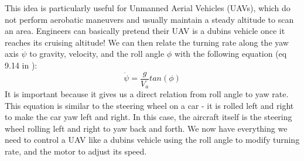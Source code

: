 \documentclass[12pt,journal,compsoc]{IEEEtran}
\begin{document}
This idea is particularly useful for Unmanned Aerial Vehicles (UAVs), which do not perform aerobatic maneuvers and usually maintain a steady altitude to scan an area. Engineers can basically pretend their UAV is a dubins vehicle once it reaches its cruising altitude! We can then relate the turning rate along the yaw axis $\dot{\psi}$ to gravity, velocity, and the roll angle $\phi$ with the following equation (eq 9.14 in \cite{S-U-A}):
\[ \dot{\psi} = \frac{g}{V_a}tan(\phi) \]
It is important because it gives us a direct relation from roll angle to yaw rate. This equation is similar to the steering wheel on a car - it is rolled left and right to make the car yaw left and right. In this case, the aircraft itself is the steering wheel rolling left and right to yaw back and forth. We now have everything we need to control a UAV like a dubins vehicle using the roll angle to modify turning rate, and the motor to adjust its speed.
\end{document}
